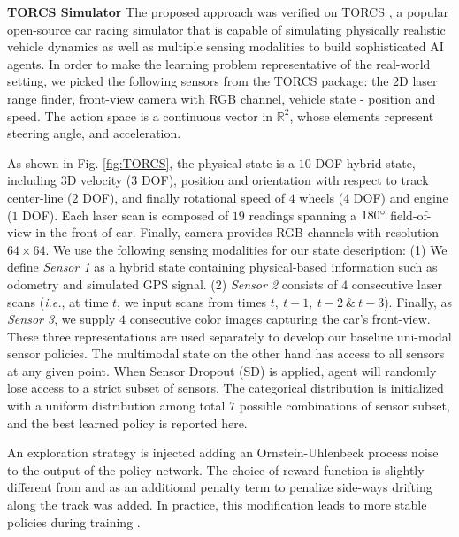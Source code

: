 \documentclass[../thesis.tex]{subfiles}
\begin{document}
\textbf{TORCS Simulator}
The proposed approach was verified on TORCS \cite{wymann2000torcs}, a popular open-source car racing simulator that is capable of simulating physically realistic vehicle dynamics as well as multiple sensing modalities \cite{GymTORCS} to build sophisticated AI agents. In order to make the learning problem representative of the real-world setting, we picked the following sensors from the TORCS package: the 2D laser range finder, front-view camera with RGB channel, vehicle state - position and speed. The action space is a continuous vector in $\mathbb{R}^2$, whose elements represent steering angle, and acceleration.
 
As shown in Fig. \ref{fig:TORCS}, the physical state is a $10$ DOF hybrid state, including $3$D velocity ($3$ DOF), position and orientation with respect to track center-line ($2$ DOF), and finally rotational speed of $4$ wheels ($4$ DOF) and engine ($1$ DOF). Each laser scan is composed of $19$ readings spanning a $180\degree$ field-of-view in the front of car. Finally, camera provides RGB channels with resolution $64 \times 64$. We use the following sensing modalities for our state description: (1) We define \emph{Sensor 1} as a hybrid state containing physical-based information such as odometry and simulated GPS signal. (2) \emph{Sensor 2} consists of $4$ consecutive laser scans (\textit{i.e.}, at time $t$, we input scans from times $t,~ t-1,~t-2~\&~t-3$). Finally, as \emph{Sensor 3}, we supply $4$ consecutive color images capturing the car's front-view. These three representations are used separately to develop our baseline uni-modal sensor policies. The multimodal state on the other hand has access to all sensors at any given point. When Sensor Dropout (SD) is applied, agent will randomly lose access to a strict subset of sensors. The categorical distribution is initialized with a uniform distribution among total $7$ possible combinations of sensor subset, and the best learned policy is reported here.
 
An exploration strategy is injected adding an Ornstein-Uhlenbeck process noise \cite{uhlenbeck1930theory} to the output of the policy network. The choice of reward function is slightly different from  \citet{DBLP:journals/corr/LillicrapHPHETS15} and \citet{A3C} as an additional penalty term to penalize side-ways drifting along the track was added. In practice, this modification leads to more stable policies during training \cite{BenLau16}.
 
\end{document}

